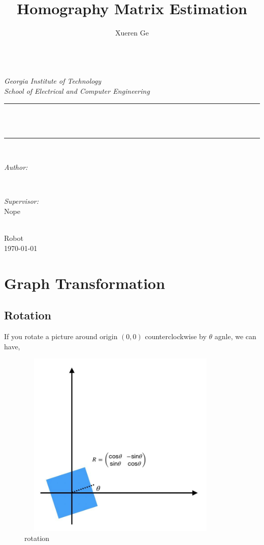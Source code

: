 \documentclass[12pt, a4 paper]{article}
\title{Homography Matrix Estimation}
\author{\textup{Xueren Ge}}
\begin{document}
\begin{titlepage}
	\newcommand{\HRule}{\rule{\linewidth}{0.5mm}}
	\center 
	\quad\\[1.5cm]
	\textsl{\Large Georgia Institute of Technology }\\[0.5cm] 
	\textsl{\large School of Electrical and Computer Engineering}\\[0.5cm] 
	\makeatletter
	\HRule \\[0.4cm]
	{ \huge \bfseries \@title}\\[0.4cm] 
	\HRule \\[1.5cm]
	\begin{minipage}{0.4\textwidth}
		\begin{flushleft} \large
			\emph{Author:}\\
			\@author
		\end{flushleft}
    \end{minipage}
    ~
	\begin{minipage}{0.4\textwidth}
		\begin{flushright} \large
			\emph{Supervisor:} \\
			\textup{Nope}
		\end{flushright}
	\end{minipage}\\[3cm]
	\makeatother
	{\large Robot}\\[0.5cm]
	{\large \today}\\[2cm] 
	\vfill 
\end{titlepage}


\section{Graph Transformation}
\subsection{Rotation}
If you rotate a picture around origin $(0, 0)$
counterclockwise by $\theta$ agnle, we can have,
\begin{figure}[h]
    \centering
    \includegraphics[width=10cm,height=9cm]{rotation.jpg}
    \caption{rotation}
\end{figure}
\end{document}
